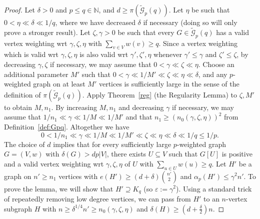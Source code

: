 \documentclass[11pt, a4paper]{article}
\theoremstyle{definition}
\def\de{{\delta}}
\def\eps{{\varepsilon}}
\newcommand{\cG}{\mathcal{G}}
\begin{document}
\begin{proof}
	Let $\delta>0$ and $p \leq q \in \mathbb{N}$, and $d\ge \pi(\widetilde{\cG}_p(q))$. Let $\eta$ be such that $0 < \eta \ll \delta \ll 1/q$, where we have decreased $\delta$ if necessary (doing so will only prove a stronger result). 
	Let $\zeta,\gamma>0$ be such that every $G \in \widetilde{\cG}_p(q)$ has a valid vertex weighting wrt $\gamma,\zeta,\eta$ with $\sum_{v \in V}w(v) \geq q$.
	Since a vertex weighting which is valid wrt $\gamma,\zeta,\eta$ is also valid wrt $\gamma',\zeta',\eta$ whenever $\gamma' \leq \gamma$ and $\zeta' \leq \zeta$, by decreasing $\gamma,\zeta$ if necessary, we may assume that $0 < \gamma \ll \zeta \ll \eta$.
	Choose an additional parameter $M'$ such that
	$0 < \gamma \ll 1/M' \ll \zeta \ll \eta \ll \delta$, and any $p$-weighted graph on at least $M'$ vertices is sufficiently large in the sense of the definition of $\pi(\widetilde{\cG}_p(q))$.
	Apply Theorem~\ref{reg} (the Regularity Lemma) to $\zeta,M'$ to obtain $M,n_1$.
	By increasing $M,n_1$ and decreasing $\gamma$ if necessary, we may assume that $1/n_1 \ll \gamma \ll 1/M \ll 1/M'$
	and that $n_1 \geq (n_0(\gamma,\zeta,\eta))^2$ from Definition~\ref{def:Gpq}.
	Altogether we have
	$$
	0 < 1/n_1 \ll \gamma \ll 1/M \ll 1/M' \ll \zeta \ll \eta \ll \delta \ll 1/q \leq 1/p.
	$$
	The choice of $d$ implies that for every sufficiently large $p$-weighted graph $G=(V,w)$ with $\delta(G)>dp|V|$, there exists $U \subseteq V$ such that $G[U]$ is positive and a valid vertex weighting wrt $\gamma,\zeta,\eta$ of $U$ with $\sum_{u \in U}w(u) \geq q$.
	Let $H'$ be a graph on $n' \geq n_1$ vertices with $e(H') \geq (d+\delta)\binom{n'}{2}$ and  $\alpha_p(H')\le \gamma^2 n'$. To prove the lemma, we will show that $H' \supseteq K_{q}$ (so $\eps:=\gamma^2$). Using a standard trick of repeatedly removing low degree vertices, we can pass from $H'$ to an $n$-vertex subgraph $H$ with $n\ge \de^{1/4}n'\ge n_0(\gamma,\zeta,\eta)$ and $\de(H)\ge (d+\frac{\de}{2})n$.
	

\end{proof}
\end{document}
